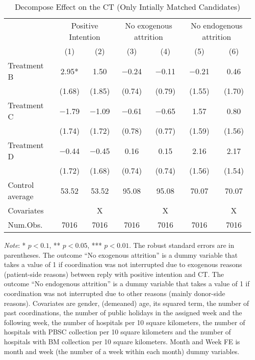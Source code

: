 \documentclass[12pt, a4paper]{article}
\begin{document}
\begin{table}[H]

\caption{\label{tab:test-decompose-init}Decompose Effect on the CT (Only Intially Matched Candidates)}
\centering
\fontsize{8}{10}\selectfont
\begin{threeparttable}
\begin{tabular}[t]{lcccccc}
\toprule
\multicolumn{1}{c}{ } & \multicolumn{2}{c}{Positive Intention} & \multicolumn{2}{c}{No exogenous attrition} & \multicolumn{2}{c}{No endogenous attrition} \\
\cmidrule(l{3pt}r{3pt}){2-3} \cmidrule(l{3pt}r{3pt}){4-5} \cmidrule(l{3pt}r{3pt}){6-7}
  & (1) & (2) & (3) & (4) & (5) & (6)\\
\midrule
Treatment B & \num{2.95}* & \num{1.50} & \num{-0.24} & \num{-0.11} & \num{-0.21} & \num{0.46}\\
 & (\num{1.68}) & (\num{1.85}) & (\num{0.74}) & (\num{0.79}) & (\num{1.55}) & (\num{1.70})\\
Treatment C & \num{-1.79} & \num{-1.09} & \num{-0.61} & \num{-0.65} & \num{1.57} & \num{0.80}\\
 & (\num{1.74}) & (\num{1.72}) & (\num{0.78}) & (\num{0.77}) & (\num{1.59}) & (\num{1.56})\\
Treatment D & \num{-0.44} & \num{-0.45} & \num{0.16} & \num{0.15} & \num{2.16} & \num{2.17}\\
 & (\num{1.72}) & (\num{1.68}) & (\num{0.74}) & (\num{0.74}) & (\num{1.56}) & (\num{1.54})\\
\midrule
Control average & 53.52 & 53.52 & 95.08 & 95.08 & 70.07 & 70.07\\
Covariates &  & X &  & X &  & X\\
Num.Obs. & \num{7016} & \num{7016} & \num{7016} & \num{7016} & \num{7016} & \num{7016}\\
\bottomrule
\end{tabular}
\begin{tablenotes}
\item \emph{Note}: * $p < 0.1$, ** $p < 0.05$, *** $p < 0.01$. The robust standard errors are in parentheses. The outcome ``No exogenous attrition'' is a dummy variable that takes a value of 1 if coordination was not interrupted due to exogenous reasons (patient-side reasons) between reply with positive intention and CT. The outcome ``No endogenous attrition'' is a dummy variable that takes a value of 1 if coordination was not interrupted due to other reasons (mainly donor-side reasons). Covariates are gender, (demeaned) age, its squared term, the number of past coordinations, the number of public holidays in the assigned week and the following week, the number of hospitals per 10 square kilometers, the number of hospitals with PBSC collection per 10 square kilometers and the number of hospitals with BM collection per 10 square kilometers. Month and Week FE is month and week (the number of a week within each month) dummy variables.
\end{tablenotes}
\end{threeparttable}
\end{table}
\end{document}
